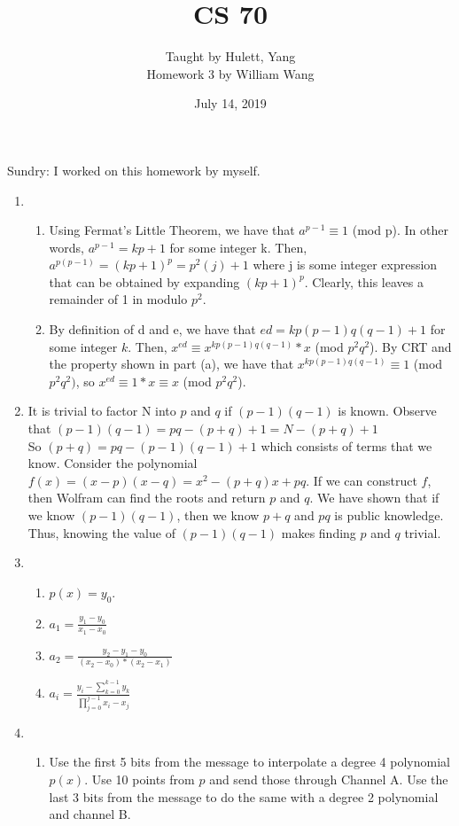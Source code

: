 \documentclass[a4paper]{article}
\title{\textbf{CS 70}}
\author{\large Taught by Hulett, Yang\\
Homework 3 by William Wang}
\date{July 14, 2019}
\newcommand{\<}{\langle}
\renewcommand{\>}{\rangle}
\renewcommand{\^}{\wedge}
\begin{document}
\maketitle
\newpage
Sundry: I worked on this homework by myself.\\
\begin{enumerate}
    \item
        \begin{enumerate}
            \item Using Fermat's Little Theorem, we have that $a^{p-1} \equiv 1$ (mod p). In other words, $a^{p-1} = kp + 1$ for some integer k. Then, $a^{p(p-1)} = (kp + 1)^p = p^2(j) + 1$ where j is some integer expression that can be obtained by expanding $(kp + 1)^p$. Clearly, this leaves a remainder of 1 in modulo $p^2$.
            \item By definition of d and e, we have that $ed = kp(p-1)q(q-1) + 1$ for some integer $k$. Then, $x^{ed} \equiv x^{kp(p-1)q(q-1)} * x$ (mod $p^2q^2$). By CRT and the property shown in part (a), we have that $x^{kp(p-1)q(q-1)} \equiv 1$ (mod $p^2q^2)$, so $x^{ed} \equiv 1 * x \equiv x$ (mod $p^2q^2$).
        \end{enumerate}
    \item
        It is trivial to factor N into $p$ and $q$ if $(p-1)(q-1)$ is known. Observe that $(p-1)(q-1) = pq - (p+q) + 1 = N - (p+q) + 1$\\ So $(p+q) = pq - (p-1)(q-1) + 1$ which consists of terms that we know. Consider the polynomial $f(x) = (x-p)(x-q) = x^2 - (p+q)x + pq$. If we can construct $f$, then Wolfram can find the roots and return $p$ and $q$. We have shown that if we know $(p-1)(q-1)$, then we know $p + q$ and $pq$ is public knowledge. Thus, knowing the value of $(p-1)(q-1)$ makes finding $p$ and $q$ trivial.
    \item
        \begin{enumerate}
            \item $p(x) = y_0$.
            \item $a_1 = \frac{y_1 - y_0}{x_1 - x_0}$
            \item $a_2 = \frac{y_2 - y_1 - y_0}{(x_2-x_0) * (x_2 - x_1)}$
            \item $a_i = \frac{y_i - \sum_{k=0}^{k-1} y_k}{\prod_{j=0}^{j-1} x_i - x_j}$
        \end{enumerate}
    \item
        \begin{enumerate}
            \item Use the first 5 bits from the message to interpolate a degree 4 polynomial $p(x)$. Use 10 points from $p$ and send those through Channel A. Use the last 3 bits from the message to do the same with a degree 2 polynomial and channel B.

\end{enumerate}
\end{enumerate}
\end{document}
